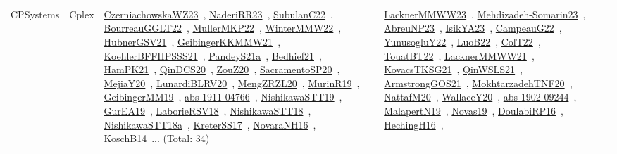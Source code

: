 {\begin{longtable}{lp{3cm}>{\raggedright\arraybackslash}p{6cm}>{\raggedright\arraybackslash}p{6cm}>{\raggedright\arraybackslash}p{8cm}}
CPSystems & Cplex & \href{works/CzerniachowskaWZ23.pdf}{CzerniachowskaWZ23}~\cite{CzerniachowskaWZ23}, \href{works/NaderiRR23.pdf}{NaderiRR23}~\cite{NaderiRR23}, \href{works/SubulanC22.pdf}{SubulanC22}~\cite{SubulanC22}, \href{works/BourreauGGLT22.pdf}{BourreauGGLT22}~\cite{BourreauGGLT22}, \href{works/MullerMKP22.pdf}{MullerMKP22}~\cite{MullerMKP22}, \href{works/WinterMMW22.pdf}{WinterMMW22}~\cite{WinterMMW22}, \href{works/HubnerGSV21.pdf}{HubnerGSV21}~\cite{HubnerGSV21}, \href{works/GeibingerKKMMW21.pdf}{GeibingerKKMMW21}~\cite{GeibingerKKMMW21}, \href{works/KoehlerBFFHPSSS21.pdf}{KoehlerBFFHPSSS21}~\cite{KoehlerBFFHPSSS21}, \href{works/PandeyS21a.pdf}{PandeyS21a}~\cite{PandeyS21a}, \href{works/Bedhief21.pdf}{Bedhief21}~\cite{Bedhief21}, \href{works/HamPK21.pdf}{HamPK21}~\cite{HamPK21}, \href{works/QinDCS20.pdf}{QinDCS20}~\cite{QinDCS20}, \href{works/ZouZ20.pdf}{ZouZ20}~\cite{ZouZ20}, \href{works/SacramentoSP20.pdf}{SacramentoSP20}~\cite{SacramentoSP20}, \href{works/MejiaY20.pdf}{MejiaY20}~\cite{MejiaY20}, \href{works/LunardiBLRV20.pdf}{LunardiBLRV20}~\cite{LunardiBLRV20}, \href{works/MengZRZL20.pdf}{MengZRZL20}~\cite{MengZRZL20}, \href{works/MurinR19.pdf}{MurinR19}~\cite{MurinR19}, \href{works/GeibingerMM19.pdf}{GeibingerMM19}~\cite{GeibingerMM19}, \href{works/abs-1911-04766.pdf}{abs-1911-04766}~\cite{abs-1911-04766}, \href{works/NishikawaSTT19.pdf}{NishikawaSTT19}~\cite{NishikawaSTT19}, \href{works/GurEA19.pdf}{GurEA19}~\cite{GurEA19}, \href{works/LaborieRSV18.pdf}{LaborieRSV18}~\cite{LaborieRSV18}, \href{works/NishikawaSTT18.pdf}{NishikawaSTT18}~\cite{NishikawaSTT18}, \href{works/NishikawaSTT18a.pdf}{NishikawaSTT18a}~\cite{NishikawaSTT18a}, \href{works/KreterSS17.pdf}{KreterSS17}~\cite{KreterSS17}, \href{works/NovaraNH16.pdf}{NovaraNH16}~\cite{NovaraNH16}, \href{works/KoschB14.pdf}{KoschB14}~\cite{KoschB14}... (Total: 34) & \href{works/LacknerMMWW23.pdf}{LacknerMMWW23}~\cite{LacknerMMWW23}, \href{works/Mehdizadeh-Somarin23.pdf}{Mehdizadeh-Somarin23}~\cite{Mehdizadeh-Somarin23}, \href{works/AbreuNP23.pdf}{AbreuNP23}~\cite{AbreuNP23}, \href{works/IsikYA23.pdf}{IsikYA23}~\cite{IsikYA23}, \href{works/CampeauG22.pdf}{CampeauG22}~\cite{CampeauG22}, \href{works/YunusogluY22.pdf}{YunusogluY22}~\cite{YunusogluY22}, \href{works/LuoB22.pdf}{LuoB22}~\cite{LuoB22}, \href{works/ColT22.pdf}{ColT22}~\cite{ColT22}, \href{works/TouatBT22.pdf}{TouatBT22}~\cite{TouatBT22}, \href{works/LacknerMMWW21.pdf}{LacknerMMWW21}~\cite{LacknerMMWW21}, \href{works/KovacsTKSG21.pdf}{KovacsTKSG21}~\cite{KovacsTKSG21}, \href{works/QinWSLS21.pdf}{QinWSLS21}~\cite{QinWSLS21}, \href{works/ArmstrongGOS21.pdf}{ArmstrongGOS21}~\cite{ArmstrongGOS21}, \href{works/MokhtarzadehTNF20.pdf}{MokhtarzadehTNF20}~\cite{MokhtarzadehTNF20}, \href{works/NattafM20.pdf}{NattafM20}~\cite{NattafM20}, \href{works/WallaceY20.pdf}{WallaceY20}~\cite{WallaceY20}, \href{works/abs-1902-09244.pdf}{abs-1902-09244}~\cite{abs-1902-09244}, \href{works/MalapertN19.pdf}{MalapertN19}~\cite{MalapertN19}, \href{works/Novas19.pdf}{Novas19}~\cite{Novas19}, \href{works/DoulabiRP16.pdf}{DoulabiRP16}~\cite{DoulabiRP16}, \href{works/HechingH16.pdf}{HechingH16}~\cite{HechingH16}, 
\end{longtable}}
